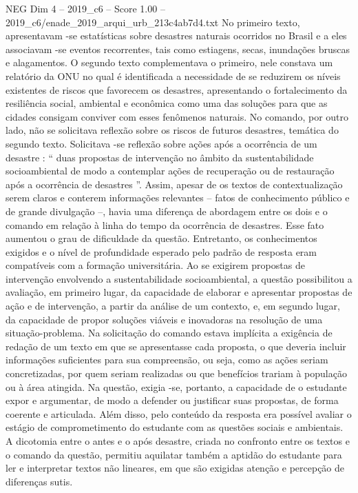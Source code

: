 \begin{textsample}{NEG Dim 4 – 2019\_c6 – Score 1.00 – 2019\_c6/enade\_2019\_arqui\_urb\_213c4ab7d4.txt}
No primeiro texto, apresentavam -se estatísticas sobre desastres naturais ocorridos no Brasil e a eles associavam -se eventos recorrentes, tais como estiagens, secas, inundações bruscas e alagamentos.
O segundo texto complementava o primeiro, nele constava um relatório da ONU no qual é identificada a necessidade de se reduzirem os níveis existentes de riscos que favorecem os desastres, apresentando o fortalecimento da resiliência social, ambiental e econômica como uma das soluções para que as cidades consigam conviver com esses fenômenos naturais.
No comando, por outro lado, não se solicitava reflexão sobre os riscos de futuros desastres, temática do segundo texto.
Solicitava -se reflexão sobre ações após a ocorrência de um desastre : “ duas propostas de intervenção no âmbito da sustentabilidade socioambiental de modo a contemplar ações de recuperação ou de restauração após a ocorrência de desastres ”.
Assim, apesar de os textos de contextualização serem claros e conterem informações relevantes – fatos de conhecimento público e de grande divulgação –, havia uma diferença de abordagem entre os dois e o comando em relação à linha do tempo da ocorrência de desastres.
Esse fato aumentou o grau de dificuldade da questão.
Entretanto, os conhecimentos exigidos e o nível de profundidade esperado pelo padrão de resposta eram compatíveis com a formação universitária.
Ao se exigirem propostas de intervenção envolvendo a sustentabilidade socioambiental, a questão possibilitou a avaliação, em primeiro lugar, da capacidade de elaborar e apresentar propostas de ação e de intervenção, a partir da análise de um contexto, e, em segundo lugar, da capacidade de propor soluções viáveis e inovadoras na resolução de uma situação-problema.
Na solicitação do comando estava implícita a exigência de redação de um texto em que se apresentasse cada proposta, o que deveria incluir informações suficientes para sua compreensão, ou seja, como as ações seriam concretizadas, por quem seriam realizadas ou que benefícios trariam à população ou à área atingida.
Na questão, exigia -se, portanto, a capacidade de o estudante expor e argumentar, de modo a defender ou justificar suas propostas, de forma coerente e articulada.
Além disso, pelo conteúdo da resposta era possível avaliar o estágio de comprometimento do estudante com as questões sociais e ambientais.
A dicotomia entre o antes e o após desastre, criada no confronto entre os textos e o comando da questão, permitiu aquilatar também a aptidão do estudante para ler e interpretar textos não lineares, em que são exigidas atenção e percepção de diferenças sutis.

\end{textsample}

